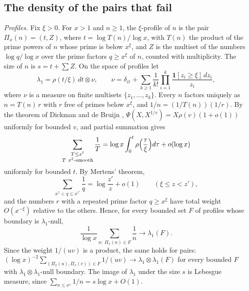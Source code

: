 \documentclass[aps,prd,twocolumn,superscriptaddress,nofootinbib,longbibliography,floatfix,showkeys,nobalancelastpage,amsmath,amssymb,10pt]{revtex4-2}
\theoremstyle{plain}
\theoremstyle{definition}
\theoremstyle{plain}
\newcommand{\one}{\mathbf{1}}
\begin{document}
\subsection{The density of the pairs that fail}\label{app:density}

\emph{Profiles.} Fix $\xi>0$. For $x>1$ and $n\ge1$, the $\xi$-profile of $n$ is the pair $\Pi_x(n)=(t,Z)$, where $t=\log T(n)/\log x$, with $T(n)$ the product of the prime powers of $n$ whose prime is below $x^\xi$, and $Z$ is the multiset of the numbers $\log q/\log x$ over the prime factors $q\ge x^\xi$ of $n$, counted with multiplicity. The size of $n$ is $s=t+\sum Z$. On the space of profiles let
\[
\lambda_1=\rho(t/\xi)\,dt\otimes\nu,\qquad\nu=\delta_\varnothing+\sum_{k\ge1}\frac1{k!}\prod_{i=1}^k\frac{\one[z_i\ge\xi]\,dz_i}{z_i},
\]
where $\nu$ is a measure on finite multisets $\{z_1,\dots,z_k\}$. Every $n$ factors uniquely as $n=T(n)\,r$ with $r$ free of primes below $x^\xi$, and $1/n=(1/T(n))(1/r)$. By the theorem of Dickman and de Bruijn \cite[Chapter~III.5]{Ten}, $\Psi(X,X^{1/v})=X\rho(v)(1+o(1))$ uniformly for bounded $v$, and partial summation gives
\[
\sum_{\substack{T\le x^t\\T\ x^\xi\text{-smooth}}}\frac1T=\log x\int_0^t\rho\Bigl(\frac\tau\xi\Bigr)d\tau+o(\log x)
\]
uniformly for bounded $t$. By Mertens' theorem,
\[
\sum_{x^z<q\le x^{z'}}\frac1q=\log\frac{z'}z+o(1)\qquad(\xi\le z<z'),
\]
and the numbers $r$ with a repeated prime factor $q\ge x^\xi$ have total weight $O(x^{-\xi})$ relative to the others. Hence, for every bounded set $F$ of profiles whose boundary is $\lambda_1$-null,
\[
\frac1{\log x}\sum_{n:\ \Pi_x(n)\in F}\frac1n\to\lambda_1(F).
\]
Since the weight $1/(uv)$ is a product, the same holds for pairs: $(\log x)^{-2}\sum_{(\Pi_x(u),\Pi_x(v))\in F}1/(uv)\to\lambda_1\otimes\lambda_1(F)$ for every bounded $F$ with $\lambda_1\otimes\lambda_1$-null boundary. The image of $\lambda_1$ under the size $s$ is Lebesgue measure, since $\sum_{n\le x^s}1/n=s\log x+O(1)$.
\end{document}
